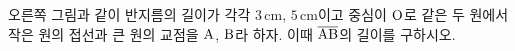 \noindent\begin{minipage}[t]{0.58\linewidth}\vspace{0pt}\raggedright 오른쪽 그림과 같이 반지름의 길이가 각각 $3\,\mathrm{cm}$, $5\,\mathrm{cm}$이고 중심이 $\mathrm{O}$로 같은 두 원에서 작은 원의 접선과 큰 원의 교점을 $\mathrm{A}$, $\mathrm{B}$라 하자. 이때 $\overline{\mathrm{AB}}$의 길이를 구하시오.\end{minipage}\hfill\begin{minipage}[t]{0.4\linewidth}\vspace{0pt}\centering \resizebox{\ifdim\width>\linewidth\linewidth\else\width\fi}{!}{}\end{minipage}\par
